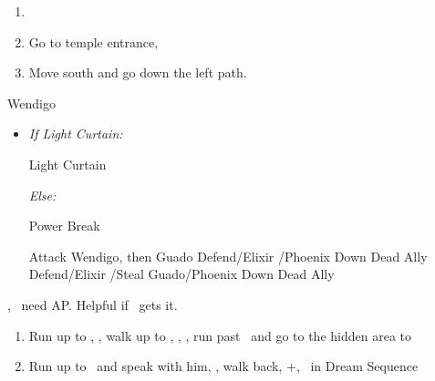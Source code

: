 \begin{enumerate}[resume]
  \item \formation{\rikku}{\tidus}{\yuna}
  \item Go to temple entrance, \sd
  \item Move south and go down the left path.
\end{enumerate}
\begin{battle}[18000]{Wendigo}
  \begin{itemize}
    \tidusf Haste \tidus
    \tidusf Switch Weapon to Brotherhood
    \tidusf Attack Guado B (Top One)
    \item \textit{If Light Curtain:}
    \begin{itemize}
	    \rikkuf Light Curtain \tidus
    \end{itemize}
    \textit{Else:}
    \begin{itemize}
    		\switch{\rikku}{\auron}
    		\auronf Power Break
	\end{itemize}
    \tidusf Attack Wendigo, then Guado
    \yunaf Defend/Elixir \tidus/Phoenix Down Dead Ally
    \rikkuf Defend/Elixir \tidus/Steal Guado/Phoenix Down Dead Ally
    \switch{\yuna}{\lulu}
  \end{itemize}
\yuna, \tidus\ need AP. Helpful if \lulu\ gets it.
\end{battle}
\begin{enumerate}[resume]
  \item Run up to \rikku, \sd, walk up to \yuna, \sd, \save, run past \kimahri\ and go to the hidden area to 
  \item Run up to \auron\ and speak with him, \sd, walk back, \cs+\skippablefmv[1:00], \sd\ in Dream Sequence
\end{enumerate}